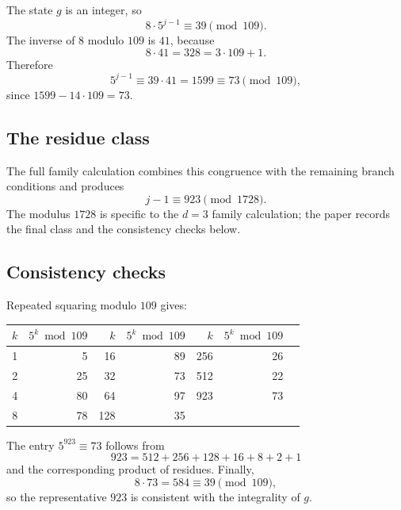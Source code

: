The state $g$ is an integer, so
\begin{equation*}
  8\cdot5^{j-1}\equiv39\pmod{109}.
\end{equation*}
The inverse of $8$ modulo $109$ is $41$, because
\begin{equation*}
  8\cdot41=328=3\cdot109+1.
\end{equation*}
Therefore
\begin{equation*}
  5^{j-1}\equiv39\cdot41=1599\equiv73\pmod{109},
\end{equation*}
since $1599-14\cdot109=73$.

\subsection{The residue class}

The full family calculation combines this congruence with the
remaining branch conditions and produces
\begin{equation*}
  j-1\equiv923\pmod{1728}.
\end{equation*}
The modulus $1728$ is specific to the $d=3$ family calculation; the
paper records the final class and the consistency checks below.

\subsection{Consistency checks}

Repeated squaring modulo $109$ gives:
\begin{center}
\small
\begin{tabular}{@{}rrrrrrr@{}}
\toprule
$k$ & $5^k\bmod109$ & $k$ & $5^k\bmod109$ & $k$ & $5^k\bmod109$ \\
\midrule
1 & 5 & 16 & 89 & 256 & 26 \\
2 & 25 & 32 & 73 & 512 & 22 \\
4 & 80 & 64 & 97 & 923 & 73 \\
8 & 78 & 128 & 35 & & \\
\bottomrule
\end{tabular}
\end{center}
The entry $5^{923}\equiv73$ follows from
\begin{equation*}
  923=512+256+128+16+8+2+1
\end{equation*}
and the corresponding product of residues.  Finally,
\begin{equation*}
  8\cdot73=584\equiv39\pmod{109},
\end{equation*}
so the representative $923$ is consistent with the integrality of
$g$.


